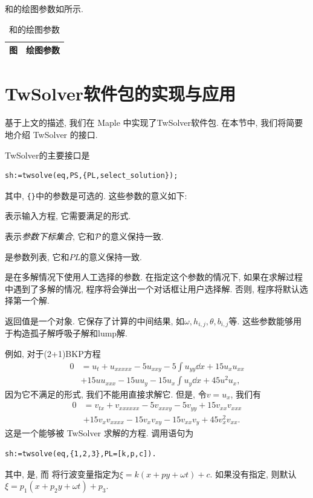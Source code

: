 和的绘图参数如所示.

\begin{table}[htbp]
\centering 
\caption{和的绘图参数\label{jm-plist}}
\small
\renewcommand{\arraystretch}{1.1}
\begin{tabular}{cp{}}
\hline 
图 & \multicolumn{1}{c}{绘图参数} \\ 
\hline 

\hline
\end{tabular}
\end{table}

\section{TwSolver软件包的实现与应用}
基于上文的描述, 我们在 Maple 中实现了TwSolver软件包. 在本节中, 我们将简要地介绍 TwSolver 的接口. 

TwSolver的主要接口是 
\begin{verbatim}
sh:=twsolve(eq,PS,{PL,select_solution});
\end{verbatim}
其中, \verb|{}|中的参数是可选的. 这些参数的意义如下: 
\begin{compactitem}[\textbullet]
\item {}表示输入方程, 它需要满足的形式.
\item {}表示\emph{参数下标集合}, 它和$\mathcal{P}$的意义保持一致. 
\item {}是参数列表, 它和$PL$的意义保持一致.
\item {}是在多解情况下使用人工选择的参数. 在指定这个参数的情况下, 如果在求解过程中遇到了多解的情况, 程序将会弹出一个对话框让用户选择解. 否则, 程序将默认选择第一个解.
\item 返回值是一个对象. 它保存了计算的中间结果, 如$\omega,h_{i,j},\theta,b_{i,j}$等. 这些参数能够用于构造孤子解\D 呼吸子解和lump解. 
\end{compactitem}
    
例如, 对于(2+1)BKP方程\CITEbaBKP
\begin{equation}
\begin{split}
0&=u_t+u_{xxxxx}-5u_{xxy}-5\int{u_{yy}\dd{x}}+15u_xu_{xx}\\
&+15uu_{xxx}-15uu_y-15u_x\int{u_y\dd{x}}+45u^2u_x, \label{BKP}
\end{split}
\end{equation}
因为它不满足的形式, 我们不能用直接求解它. 但是, 令$v=u_x$, 我们有
\begin{equation}
\begin{split}
0&=v_{tx}+v_{xxxxxx}-5v_{xxxy}-5v_{yy}+15v_{xx}v_{xxx}\\
&+15v_xv_{xxxx}-15v_xv_{xy}-15v_{xx}v_y+45v_x^2v_{xx}. \label{BKP-T}
\end{split}
\end{equation}
这是一个能够被 TwSolver 求解的方程. 调用语句为
\begin{verbatim}
sh:=twsolve(eq,{1,2,3},PL=[k,p,c]).
\end{verbatim}
其中, 是, 而 将行波变量指定为$\xi=k(x+py+\omega t)+c$. 如果没有指定, 则默认$\xi=p_1(x+p_2 y+\omega t)+p_3$. 

